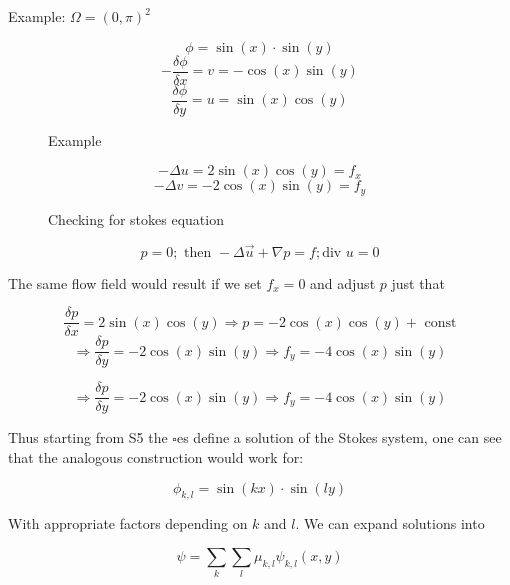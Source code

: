\documentclass[a4paper,11pt]{scrartcl}
\begin{document}
Example: $\Omega = (0, \pi)^2$
\begin{figure}[H]
	\centering
	\[ \phi = \sin(x) \cdot \sin(y) \]
	\[ - \frac{\delta \phi}{\delta x} = v = -\cos(x)\sin(y)\]
	\[ \frac{\delta \phi}{\delta y} = u = \sin(x)\cos(y)\]
	\renewcommand{\thefigure}{S7}
	\caption{Example}
	\label{fig:disc-freesplipb}
\end{figure}

\begin{figure}[H]
	\centering
	\[ - \Delta u = 2\sin(x) \cos(y) = f_x \]
	\[ - \Delta v = -2 \cos(x) \sin(y) = f_y \]
	\renewcommand{\thefigure}{S8}
	\caption{Checking for stokes equation}
	\label{fig:disc-freesplipb}
\end{figure}

\begin{figure}[H]
	\centering
	\[ p = 0; \text{ then } - \Delta \vec{u} + \nabla p = f; \text{div } u = 0\]
	\renewcommand{\thefigure}{S9}
	\caption{}
	\label{fig:disc-freesplipb}
\end{figure}

The same flow field would result if we set $f_x = 0$ and adjust $p$ just that
\begin{figure}[H]
	\centering
	\[ \frac{\delta p}{\delta x} = 2 \sin(x) \cos(y) \Rightarrow p = -2 \cos(x)\cos(y) + \text{ const} \]%
	\[ \Rightarrow \frac{\delta p}{\delta y} = -2 \cos(x) \sin(y) \Rightarrow f_y = -4 \cos(x) \sin(y)\]%
	\renewcommand{\thefigure}{S10}
	\caption{}
	\label{fig:disc-freesplipb}
\end{figure}
\begin{figure}[H]
	\centering
	\[ \Rightarrow \frac{\delta p}{\delta y} = -2 \cos(x) \sin(y) \Rightarrow f_y = -4 \cos(x) \sin(y)\]%
	\renewcommand{\thefigure}{S11}
	\caption{}
	\label{fig:disc-freesplipb}
\end{figure}

Thus starting from S5 %
the $\square$es define a solution of the Stokes system, one can see that the analogous construction would work for:
\begin{figure}[H]
	\centering
	\[ \phi_{k,l} = \sin(kx) \cdot \sin(ly)\]
	\renewcommand{\thefigure}{S12}
	\caption{}
	\label{fig:disc-freesplipb}
\end{figure}
With appropriate factors depending on $k$ and $l$. We can expand solutions into
\begin{figure}[H]
	\centering
	\[ \psi = \sum_k \sum_l \mu_{k,l} \psi_{k,l}(x,y)\]
	\renewcommand{\thefigure}{S13}
	\caption{}
	\label{fig:disc-freesplipb}
\end{figure}
\end{document}
